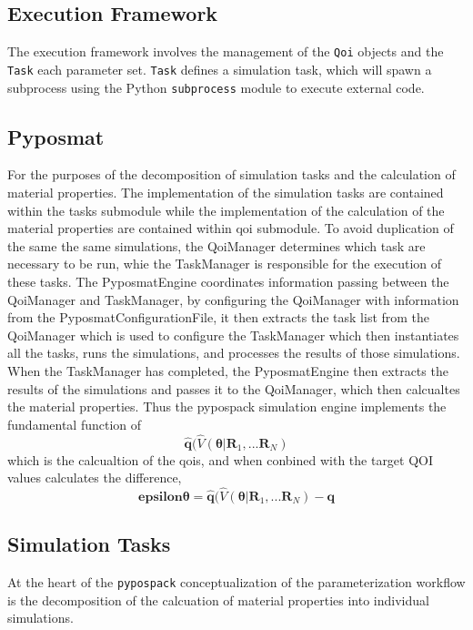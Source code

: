 \subsection{Execution Framework}

The execution framework involves the management of the \verb|Qoi| objects and the \verb|Task| each parameter set.  \verb|Task| defines a simulation task, which will spawn a subprocess using the Python \verb|subprocess| module to execute external code.

\subsection{Pyposmat}
For the purposes of the decomposition of simulation tasks and the calculation of material properties.  The implementation of the simulation tasks are contained within the tasks submodule while the implementation of the calculation of the material properties are contained within qoi submodule.  To avoid duplication of the same the same simulations, the QoiManager determines which task are necessary to be run, whie the TaskManager is responsible for the execution of these tasks.  The PyposmatEngine coordinates information passing between the QoiManager and TaskManager, by configuring the QoiManager with information from the PyposmatConfigurationFile, it then extracts the task list from the QoiManager which is used to configure the TaskManager which then instantiates all the tasks, runs the simulations, and processes the results of those simulations.  When the TaskManager has completed, the PyposmatEngine then extracts the results of the simulations and passes it to the QoiManager, which then calcualtes the material properties.  Thus the pypospack simulation engine implements the fundamental function of 
\begin{equation}
    \bm{\hat{q}}(\hat{V}(\bm{\theta}|\bm{R}_1,...\bm{R}_N)
\end{equation}
which is the calcualtion of the qois, and when conbined with the target QOI values calculates the difference,
\begin{equation}
    \bm{epsilon{\theta}}=\bm{\hat{q}}(\hat{V}(\bm{\theta}|\bm{R}_1,...\bm{R}_N)-\bm{q}
\end{equation}

\subsection{Simulation Tasks}
At the heart of the \verb|pypospack| conceptualization of the parameterization workflow is the decomposition of the calcuation of material properties into individual simulations.

